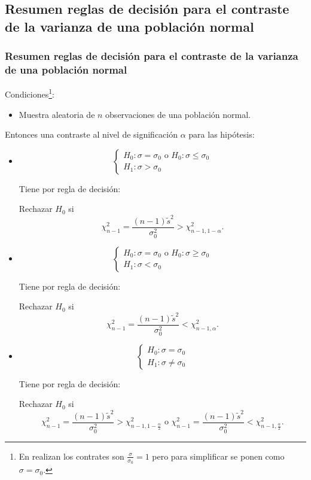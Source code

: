 \subsection{Resumen reglas de decisión para el contraste de la varianza de una población normal}
\begin{frame}
\frametitle{Resumen reglas de decisión para el contraste de la varianza de una población normal}

    Condiciones\footnote{En realizan los contrates son  $\frac{\sigma}{\sigma_0}=1$ pero para simplificar se ponen como $\sigma=\sigma_0$.}:

    \begin{itemize}
    \item Muestra aleatoria de $n$ observaciones de una población normal.
    \end{itemize}

        Entonces una contraste al nivel de significación $\alpha$ para las
    hipótesis:
\begin{itemize}
\item $$\left\{\begin{array}{l}
    H_{0}:\sigma=\sigma_{0} \mbox{ o } H_{0}:\sigma\leq \sigma_{0}\\
    H_{1}:\sigma>\sigma_{0}
    \end{array}\right.$$


    Tiene por regla de decisión:

    Rechazar $H_{0}$ si
    $$\chi_{n-1}^2=\frac{(n-1) \tilde{s}^2}{\sigma_{0}^2}>\chi_{n-1,1-\alpha}^2.$$
\end{itemize}
\end{frame}

\begin{frame}
\begin{itemize}
 \item $$\left\{\begin{array}{l}
    H_{0}:\sigma=\sigma_{0} \mbox{ o } H_{0}:\sigma\geq \sigma_{0}\\
    H_{1}:\sigma<\sigma_{0}
    \end{array}\right.$$


    Tiene por regla de decisión:

    Rechazar $H_{0}$ si
    $$\chi_{n-1}^2=\frac{(n-1) \tilde{s}^2}{\sigma_{0}^2}<\chi_{n-1,\alpha}^2.$$

\item $$\left\{\begin{array}{l}
    H_{0}:\sigma=\sigma_{0} \\
    H_{1}:\sigma\not=\sigma_{0}
    \end{array}\right.$$


    Tiene por regla de decisión:

    Rechazar $H_{0}$ si  
    $$\chi_{n-1}^2=\frac{(n-1)
    \tilde{s}^2}{\sigma_{0}^2}>\chi_{n-1,1-\frac{\alpha}{2}}^2 \mbox{ o }\chi_{n-1}^2=\frac{(n-1)
    \tilde{s}^2}{\sigma_{0}^2}<\chi_{n-1,\frac{\alpha}{2}}^2.$$
\end{itemize}
\end{frame}

